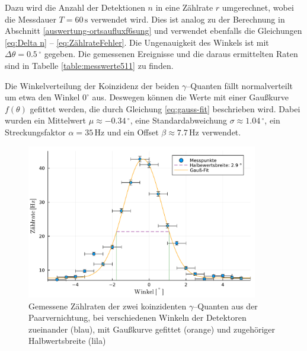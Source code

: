 \documentclass[12pt,a4paper]{scrartcl}
\numberwithin{equation}{section} %
\begin{document}
Dazu wird die Anzahl der Detektionen $n$ in eine Zählrate $r$ umgerechnet, wobei die Messdauer $T=60\,\mathrm{s}$ verwendet wird. Dies ist analog zu der Berechnung in Abschnitt \ref{auswertung-ortsaufluxf6sung}  und verwendet ebenfalls die Gleichungen \eqref{eq:Delta n} -- \eqref{eq:ZählrateFehler}. Die Ungenauigkeit des Winkels ist mit $\Delta \theta = 0.5\,^\circ$ gegeben. Die gemessenen Ereignisse und die daraus ermittelten Raten sind in Tabelle \ref{table:messwerte511} zu finden.

Die Winkelverteilung der Koinzidenz der beiden $\gamma$--Quanten fällt normalverteilt um etwa den Winkel $0^\circ$ aus. Deswegen können die Werte mit einer Gaußkurve $f(\theta)$ gefittet werden, die durch Gleichung \eqref{eq:gauss-fit} beschrieben wird. Dabei wurden ein Mittelwert $\mu\approx-0.34 \mathrm{\, ^\circ}$, eine Standardabweichung $\sigma\approx 1.04 \mathrm{\, ^\circ}$, ein Streckungsfaktor $\alpha=35 \mathrm{\, Hz}$ und ein Offset $\beta\approx7.7 \mathrm{\, Hz}$ verwendet.

\begin{figure}[h]
	\centering
	\includegraphics[width=0.9\textwidth]{../media/B3.4/plot511.pdf}
	\caption{Gemessene Zählraten der zwei koinzidenten $\gamma$--Quanten aus der Paarvernichtung, bei verschiedenen Winkeln der Detektoren zueinander (blau), mit Gaußkurve gefittet (orange) und zugehöriger Halbwertsbreite (lila)}
	\label{fig:plot511}
\end{figure}
\end{document}

